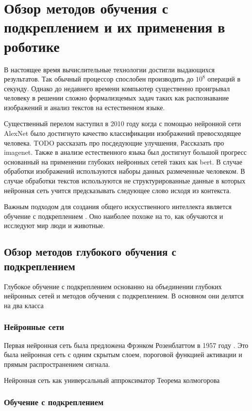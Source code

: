 \chapter{Обзор методов обучения с подкреплением и их применения в роботике}\label{ch:ch1}

В настоящее время вычислительные технологии достигли выдающихся результатов. Так обычный процессор спослобен производить до $10^8$ операций в секунду. Однако до недавнего времени компьютер существенно проигрывал человеку в решении сложно формализцемых задач таких как распознавание изображений и анализ текстов на естественном языке. 

Существенный перелом наступил в 2010 году когда с помощью нейронной сети AlexNet было достигнуто качество классификации изображений превосходящее человека. TODO рассказать про посдедующие улучшения, Рассказать про imagenet.
Также в анализе естественного языка был достигнут большой прогресс основанный на применении глубоких нейронных сетей таких как bert. В случае обработки изображений используются наборы данных размеченные человеком. В случае обработки текстов используются не структурированные данные в которых нейронная сеть учится предсказывать следующее слово исходя из контекста. 

Важным подходом для создания общего искусственного интеллекта является обучение с подкреплением \cite{reward_is_enough}. Оно наиболее похоже на то, как обучаются и исследуют мир люди и животные.  


\section{Обзор методов глубокого обучения с подкреплением}\label{sec:ch1/sec1}

Глубокое обучение с подкреплением основанно на объединении глубоких нейронных сетей и методов обучения с подкреплением. 
В основном они делятся на два класса 

\subsection{Нейронные сети}

Первая нейронная сеть была предложена Фрэнком Розенблаттом в 1957 году \cite{rosenblatt}. Это была нейронная сеть с одним скрытым слоем, пороговой функцией активации и прямым распространением сигнала. 


Нейронная сеть как универсальный аппроксиматор
Теорема колмогорова


\subsection{Обучение с подкреплением}

